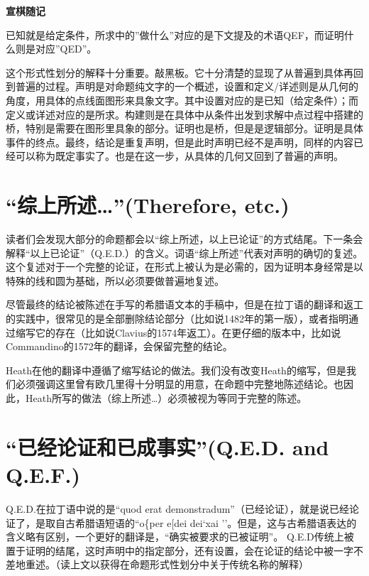 \documentclass[
]{book}
\begin{document}
\textbf{宣棋随记}

已知就是给定条件，所求中的''做什么''对应的是下文提及的术语QEF，而证明什么则是对应''QED''。

这个形式性划分的解释十分重要。敲黑板。它十分清楚的显现了从普遍到具体再回到普遍的过程。声明是对命题纯文字的一个概述，设置和定义/详述则是从几何的角度，用具体的点线面图形来具象文字。其中设置对应的是已知（给定条件）；而定义或详述对应的是所求。构建则是在具体中从条件出发到求解中点过程中搭建的桥，特别是需要在图形里具象的部分。证明也是桥，但是是逻辑部分。证明是具体事件的终点。最终，结论是重复声明，但是此时声明已经不是声明，同样的内容已经可以称为既定事实了。也是在这一步，从具体的几何又回到了普遍的声明。

\hypertarget{ux7efcux4e0aux6240ux8ff0therefore-etc.}{%
\section*{\texorpdfstring{``综上所述\ldots{}''(Therefore, etc.)}{``综上所述\ldots''(Therefore, etc.)}}\label{ux7efcux4e0aux6240ux8ff0therefore-etc.}}

读者们会发现大部分的命题都会以``综上所述，以上已论证''的方式结尾。下一条会解释``以上已论证''（Q.E.D.）的含义。词语``综上所述''代表对声明的确切的复述。这个复述对于一个完整的论证，在形式上被认为是必需的，因为证明本身经常是以特殊的线和圆为基础，所以必须要做普遍地复述。

尽管最终的结论被陈述在手写的希腊语文本的手稿中，但是在拉丁语的翻译和返工的实践中，很常见的是全部删除结论部分（比如说1482年的第一版），或者指明通过缩写它的存在（比如说Clavius的1574年返工）。在更仔细的版本中，比如说Commandino的1572年的翻译，会保留完整的结论。

Heath在他的翻译中遵循了缩写结论的做法。我们没有改变Heath的缩写，但是我们必须强调这里曾有欧几里得十分明显的用意，在命题中完整地陈述结论。也因此，Heath所写的做法（综上所述\ldots）必须被视为等同于完整的陈述。

\hypertarget{ux5df2ux7ecfux8bbaux8bc1ux548cux5df2ux6210ux4e8bux5b9eq.e.d.-and-q.e.f.}{%
\section*{``已经论证和已成事实''(Q.E.D. and Q.E.F.)}\label{ux5df2ux7ecfux8bbaux8bc1ux548cux5df2ux6210ux4e8bux5b9eq.e.d.-and-q.e.f.}}

Q.E.D.在拉丁语中说的是``quod erat demonstradum''（已经论证），就是说已经论证了，是取自古希腊语短语的``o\{per e{[}dei dei`xai ''。但是，这与古希腊语表达的含义略有区别，一个更好的翻译是，``确实被要求的已被证明''。 Q.E.D传统上被置于证明的结尾，这时声明中的指定部分，还有设置，会在论证的结论中被一字不差地重述。（读上文以获得在命题形式性划分中关于传统名称的解释）
\end{document}

